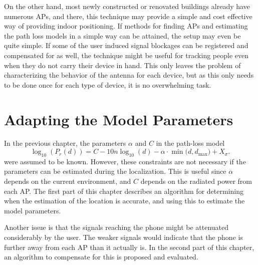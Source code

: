 \documentclass{LTHthesis}
\begin{document}
On the other hand, most newly constructed or renovated buildings already have numerous APs, and there, this technique may provide a simple and cost effective way of providing indoor positioning. If methods for finding APs and estimating the path loss models in a simple way can be attained, the setup may even be quite simple. If some of the user induced signal blockages can be registered and compensated for as well, the technique might be useful for tracking people even when they do not carry their device in hand. This only leaves the problem of characterizing the behavior of the antenna for each device, but as this only needs to be done once for each type of device, it is no overwhelming task.        
%
\chapter{Adapting the Model Parameters} %
\label{chap:adapt}
%

In the previous chapter, the parameters $\alpha$ and $C$ in the path-loss model 
%
\begin{equation}
\log_{10}({P_r(d)})=C-10n\log_{10}(d) - \alpha\cdot\min({d, d_{\text{max}})}+ X_\sigma.
\label{equation:model_to_adapt}
\end{equation}
%
were assumed to be known. However, these constraints are not necessary if the parameters can be estimated during the localization. This is useful since $\alpha$ depends on the current environment, and $C$ depends on the radiated power from each AP. The first part of this chapter describes an algorithm for determining when the estimation of the location is accurate, and using this to estimate the model parameters. 

Another issue is that the signals reaching the phone might be attenuated considerably by the user. The weaker signals would indicate that the phone is further away from each AP than it actually is. In the second part of this chapter, an algorithm to compensate for this is proposed and evaluated.

%
\end{document}

